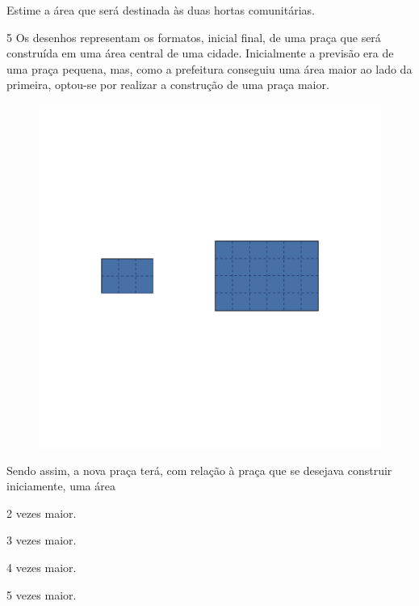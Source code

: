 Estime a área que será destinada às duas hortas comunitárias.



\num{5} Os desenhos representam os formatos, inicial  final, de uma praça que será construída em uma
área central de uma cidade. Inicialmente a previsão era de uma praça
pequena, mas, como a prefeitura conseguiu uma área maior ao lado da
primeira, optou-se por realizar a construção de uma praça maior.

\begin{figure}[htpb!]
\includegraphics[width=\textwidth]{../ilustracoes/MAT5/SAEB_5ANO_MAT_figura39.png}
\end{figure}

Sendo assim, a nova praça terá, com relação à praça que se
desejava construir iniciamente, uma área

\begin{escolha}
\item
  2 vezes maior.
\item
  3 vezes maior.
\item
  4 vezes maior.
\item
  5 vezes maior.
\end{escolha}

